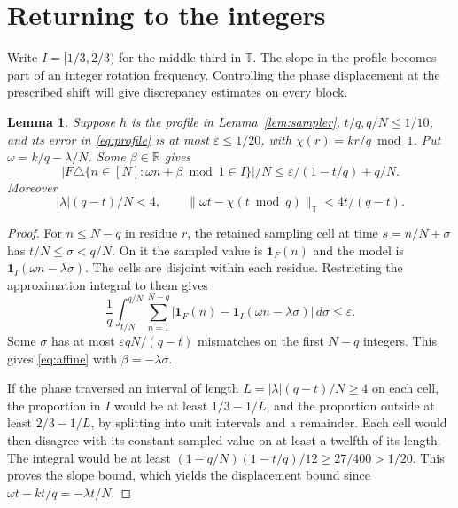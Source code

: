 \documentclass[11pt,reqno]{amsart}
\newtheorem{lemma}[theorem]{Lemma}
\newcommand{\R}{\mathbb R}
\newcommand{\T}{\mathbb T}
\newcommand{\ind}{\mathbf 1}
\numberwithin{equation}{section}
\begin{document}
\section{Returning to the integers}\label{sec:return-integers}

Write \(I=[1/3,2/3)\) for the middle third in \(\T\).
The slope in the profile becomes part of an integer rotation
frequency. Controlling the phase displacement at the prescribed
shift will give discrepancy estimates on every block.

\begin{lemma}\label{lem:unfold}
Suppose \(h\) is the profile in Lemma~\ref{lem:sampler},
\(t/q,q/N\le1/10\), and its error in \eqref{eq:profile} is at most
\(\varepsilon\le1/20\), with \(\chi(r)=kr/q\bmod1\).
Put \(\omega=k/q-\lambda/N\). Some \(\beta\in\R\) gives
\begin{equation}\label{eq:affine}
 |F\triangle\{n\in[N]:\omega n+\beta\bmod1\in I\}|/N
 \le \varepsilon/(1-t/q)+q/N .
\end{equation}
Moreover
\begin{equation}\label{eq:unfold-displacement}
 |\lambda|(q-t)/N<4,\qquad
 \|\omega t-\chi(t\bmod q)\|_{\T}<4t/(q-t).
\end{equation}
\end{lemma}

\begin{proof}
For \(n\le N-q\) in residue \(r\), the retained sampling cell
at time \(s=n/N+\sigma\) has \(t/N\le\sigma<q/N\).
On it the sampled value is \(\ind_F(n)\) and the model is
\(\ind_I(\omega n-\lambda\sigma)\).
The cells are disjoint within each residue. Restricting the
approximation integral to them gives
\[
 \frac1q\int_{t/N}^{q/N}
 \sum_{n=1}^{N-q}|\ind_F(n)-\ind_I(\omega n-\lambda\sigma)|
 \,d\sigma\le\varepsilon .
\]
Some \(\sigma\) has at most \(\varepsilon qN/(q-t)\)
mismatches on the first \(N-q\) integers. This gives
\eqref{eq:affine} with \(\beta=-\lambda\sigma\).

If the phase traversed an interval of length
\(L=|\lambda|(q-t)/N\ge4\) on each cell, the proportion in \(I\)
would be at least \(1/3-1/L\), and the proportion outside at
least \(2/3-1/L\), by splitting into unit intervals and a remainder.
Each cell would then disagree with its constant sampled value on
at least a twelfth of its length. The integral would be at least
\((1-q/N)(1-t/q)/12\ge27/400>1/20\).
This proves the slope bound, which yields the displacement bound
since \(\omega t-kt/q=-\lambda t/N\).
\end{proof}
\end{document}
